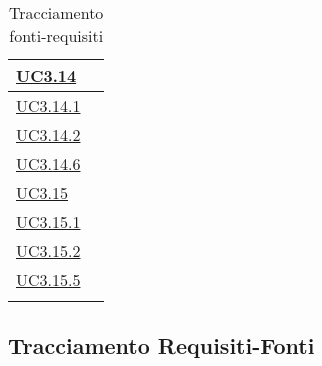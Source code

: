 \begin{longtable}{|P{6cm}|P{6cm}|}
	\hline \hyperref[UC3.14]{UC3.14} &  \\
	\hline \hyperref[UC3.14.1]{UC3.14.1} &  \\
	\hline \hyperref[UC3.14.2]{UC3.14.2} &  \\
	\hline \hyperref[UC3.14.6]{UC3.14.6} &  \\
	\hline \hyperref[UC3.15]{UC3.15} &  \\
	\hline \hyperref[UC3.15.1]{UC3.15.1} &  \\
	\hline \hyperref[UC3.15.2]{UC3.15.2} &  \\
	\hline \hyperref[UC3.15.5]{UC3.15.5} &  \\
	\hline
	\caption{Tracciamento fonti-requisiti}
\end{longtable}

\subsection{Tracciamento Requisiti-Fonti}

